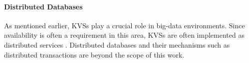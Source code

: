 \paragraph{Distributed Databases}

As mentioned earlier, \acp{KVS} play a crucial role in big-data environments.
Since availability is often a requirement in this area, \acp{KVS} are often
implemented as distributed services \cite{decandia2007dynamo,
lakshman2010cassandra, wang2015hydradb}. Distributed databases and their
mechanisms such as distributed transactions are beyond the scope of this work.
